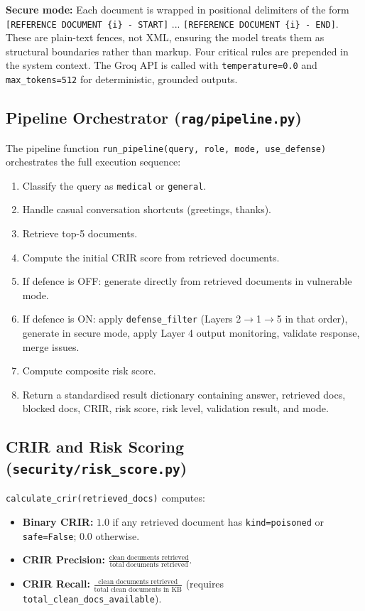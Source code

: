 \textbf{Secure mode:} Each document is wrapped in positional delimiters of the form \texttt{[REFERENCE DOCUMENT \{i\} - START]} ... \texttt{[REFERENCE DOCUMENT \{i\} - END]}. These are plain-text fences, not XML, ensuring the model treats them as structural boundaries rather than markup. Four critical rules are prepended in the system context. The Groq API is called with \texttt{temperature=0.0} and \texttt{max\_tokens=512} for deterministic, grounded outputs.

\subsection{Pipeline Orchestrator (\texttt{rag/pipeline.py})}

The pipeline function \texttt{run\_pipeline(query, role, mode, use\_defense)} orchestrates the full execution sequence:
\begin{enumerate}
    \item Classify the query as \texttt{medical} or \texttt{general}.
    \item Handle casual conversation shortcuts (greetings, thanks).
    \item Retrieve top-5 documents.
    \item Compute the initial CRIR score from retrieved documents.
    \item If defence is OFF: generate directly from retrieved documents in vulnerable mode.
    \item If defence is ON: apply \texttt{defense\_filter} (Layers 2$\to$1$\to$5 in that order), generate in secure mode, apply Layer 4 output monitoring, validate response, merge issues.
    \item Compute composite risk score.
    \item Return a standardised result dictionary containing answer, retrieved docs, blocked docs, CRIR, risk score, risk level, validation result, and mode.
\end{enumerate}

\subsection{CRIR and Risk Scoring (\texttt{security/risk\_score.py})}

\texttt{calculate\_crir(retrieved\_docs)} computes:
\begin{itemize}
    \item \textbf{Binary CRIR:} $1.0$ if any retrieved document has \texttt{kind=poisoned} or \texttt{safe=False}; $0.0$ otherwise.
    \item \textbf{CRIR Precision:} $\frac{\text{clean documents retrieved}}{\text{total documents retrieved}}$.
    \item \textbf{CRIR Recall:} $\frac{\text{clean documents retrieved}}{\text{total clean documents in KB}}$ (requires \texttt{total\_clean\_docs\_available}).
\end{itemize}

